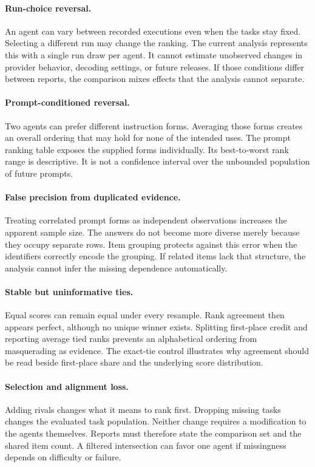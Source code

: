 \documentclass{article}
\begin{document}
\paragraph{Run-choice reversal.} An agent can vary between recorded executions even when the tasks stay fixed. Selecting a different run may change the ranking. The current analysis represents this with a single run draw per agent. It cannot estimate unobserved changes in provider behavior, decoding settings, or future releases. If those conditions differ between reports, the comparison mixes effects that the analysis cannot separate.\par
\paragraph{Prompt-conditioned reversal.} Two agents can prefer different instruction forms. Averaging those forms creates an overall ordering that may hold for none of the intended uses. The prompt ranking table exposes the supplied forms individually. Its best-to-worst rank range is descriptive. It is not a confidence interval over the unbounded population of future prompts.\par
\paragraph{False precision from duplicated evidence.} Treating correlated prompt forms as independent observations increases the apparent sample size. The answers do not become more diverse merely because they occupy separate rows. Item grouping protects against this error when the identifiers correctly encode the grouping. If related items lack that structure, the analysis cannot infer the missing dependence automatically.\par
\paragraph{Stable but uninformative ties.} Equal scores can remain equal under every resample. Rank agreement then appears perfect, although no unique winner exists. Splitting first-place credit and reporting average tied ranks prevents an alphabetical ordering from masquerading as evidence. The exact-tie control illustrates why agreement should be read beside first-place share and the underlying score distribution.\par
\paragraph{Selection and alignment loss.} Adding rivals changes what it means to rank first. Dropping missing tasks changes the evaluated task population. Neither change requires a modification to the agents themselves. Reports must therefore state the comparison set and the shared item count. A filtered intersection can favor one agent if missingness depends on difficulty or failure.\par
\end{document}
